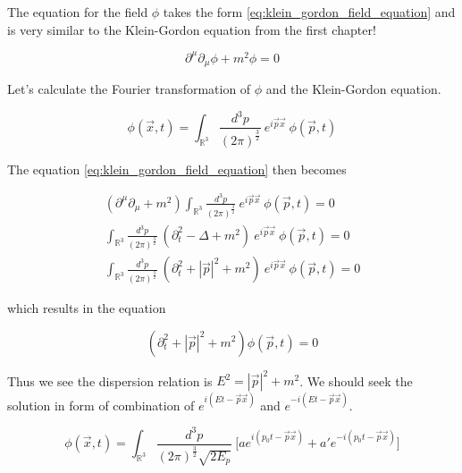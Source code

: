 The equation for the field $\phi$ takes the form \ref{eq:klein_gordon_field_equation} and is very similar to the Klein-Gordon
equation from the first chapter!

\begin{equation}
    \label{eq:klein_gordon_field_equation}
    \partial^{\mu} \partial_{\mu} \phi + m^2 \phi = 0
\end{equation}

Let's calculate the Fourier transformation of $\phi$ and the Klein-Gordon equation.

\begin{equation}
    \phi (\vec{x}, t) = \int_{\mathbb{R}^{3}} \frac{d^{3}p}{(2 \pi)^{\frac{3}{2}}} \ e^{i \vec{p} \vec{x}} \ \phi (\vec{p}, t)
\end{equation}

The equation \ref{eq:klein_gordon_field_equation} then becomes

\begin{equation*}
    \begin{gathered}
        (\partial^{\mu} \partial_{\mu} + m^2) \int_{\mathbb{R}^{3}} \frac{d^{3}p}{(2 \pi)^{\frac{3}{2}}} \ e^{i \vec{p} \vec{x}} \ \phi (\vec{p}, t) = 0 \\
        \int_{\mathbb{R}^{3}} \frac{d^{3}p}{(2 \pi)^{\frac{3}{2}}} \ (\partial_{t}^{2} - \Delta + m^2) \ e^{i \vec{p} \vec{x}} \ \phi (\vec{p}, t) = 0 \\
        \int_{\mathbb{R}^{3}} \frac{d^{3}p}{(2 \pi)^{\frac{3}{2}}} \ (\partial_{t}^{2} + | \vec{p} |^{2} + m^2) \ e^{i \vec{p} \vec{x}} \ \phi (\vec{p}, t) = 0
    \end{gathered}
\end{equation*}

which results in the equation

\begin{equation*}
    (\partial_{t}^{2} + | \vec{p} |^{2} + m^2) \phi (\vec{p}, t) = 0
\end{equation*}

Thus we see the dispersion relation is $E^{2} = | \vec{p} |^{2} + m^2$. We should seek the solution in form of combination of $e^{i (E t - \vec{p} \vec{x})}$
and $e^{- i (E t - \vec{p} \vec{x})}$.

\begin{equation*}
    \phi (\vec{x}, t) = \int_{\mathbb{R}^{3}} \frac{d^{3}p}{(2 \pi)^{\frac{3}{2}} \sqrt{2 E_{p}}} \ \bigg[a e^{i (p_{0} t - \vec{p} \vec{x})} + a' e^{- i (p_{0} t - \vec{p} \vec{x})}\bigg]
\end{equation*}

